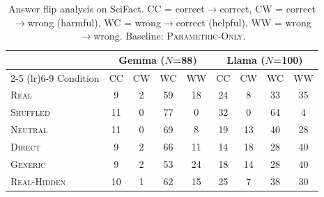 \begin{table}[t]
\centering
\caption{Answer flip analysis on SciFact. CC = correct$\to$correct, CW = correct$\to$wrong (harmful), WC = wrong$\to$correct (helpful), WW = wrong$\to$wrong. Baseline: \textsc{Parametric-Only}.}
\label{tab:flips}
\small
\begin{tabular}{l cccc cccc}
\toprule
& \multicolumn{4}{c}{Gemma ($N$=88)} & \multicolumn{4}{c}{Llama ($N$=100)} \\
\cmidrule(lr){2-5} \cmidrule(lr){6-9}
Condition & CC & CW & WC & WW & CC & CW & WC & WW \\
\midrule
\textsc{Real} & 9 & 2 & 59 & 18 & 24 & 8 & 33 & 35 \\
\textsc{Shuffled} & 11 & 0 & 77 & 0 & 32 & 0 & 64 & 4 \\
\textsc{Neutral} & 11 & 0 & 69 & 8 & 19 & 13 & 40 & 28 \\
\textsc{Direct} & 9 & 2 & 66 & 11 & 14 & 18 & 28 & 40 \\
\textsc{Generic} & 9 & 2 & 53 & 24 & 18 & 14 & 28 & 40 \\
\textsc{Real-Hidden} & 10 & 1 & 62 & 15 & 25 & 7 & 38 & 30 \\
\bottomrule
\end{tabular}
\end{table}
